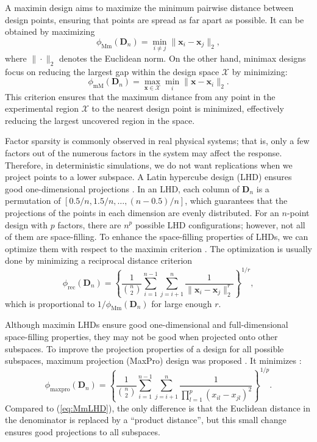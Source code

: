 A maximin design aims to maximize the minimum pairwise distance between design points, ensuring that points are spread as far apart as possible. It can be obtained by maximizing
\begin{equation}\label{eq:maximin}
    \phi_{\text{Mm}}(\bm{D}_n) = \min_{i\neq j} \|\bm{x}_i-\bm{x}_j\|_2,
\end{equation}
where $\|\cdot\|_2$ denotes the Euclidean norm.
On the other hand, minimax designs focus on reducing the largest gap within the design space $\mathcal{X}$ by minimizing:
\begin{equation*}
    \phi_{\text{mM}}(\bm{D}_n) = \max_{\bm{x}\in\mathcal{X}} \min_{i} \|\bm{x}-\bm{x}_i\|_2.
\end{equation*}
This criterion ensures that the maximum distance from any point in the experimental region $\mathcal{X}$ to the nearest design point is minimized, effectively reducing the largest uncovered region in the space. 

Factor sparsity is commonly observed in real physical systems; that is, only a few factors out of the numerous factors in the system may affect the response. Therefore, in deterministic simulations, we do not want replications when we project points to a lower subspace. A Latin hypercube design (LHD) ensures good one-dimensional projections \citep{mckay1979comparison}. In an LHD, each column of $\bm{D}_n$ is a permutation of $\left[0.5/n, 1.5/n, \dots, (n-0.5)/n\right]$, which guarantees that the projections of the points in each dimension are evenly distributed. For an $n$-point design with $p$ factors, there are $n^p$ possible LHD configurations; however, not all of them are space-filling. To enhance the space-filling properties of LHDs, we can optimize them with respect to the maximin criterion \citep{morris1995exploratory}. The optimization is usually done by minimizing a reciprocal distance criterion
\begin{equation}\label{eq:MmLHD}
    \phi_{\text{rec}}(\bm{D}_n) = \left\{\frac{1}{{n\choose 2}}\sum_{i=1}^{n-1}\sum_{j=i+1}^{n}\frac{1}{\|\bm{x}_i-\bm{x}_j\|_2^r} \right\}^{1/r},
\end{equation}
which is proportional to $1/\phi_{\text{Mm}}(\bm{D}_n)$ for large enough $r$.

Although maximin LHDs ensure good one-dimensional and full-dimensional space-filling properties, they may not be good when projected onto other subspaces. To improve the projection properties of a design for all possible subspaces, maximum projection (MaxPro) design was proposed \citep{joseph2015maximum}. It minimizes :
\begin{equation}\label{eq:maxpro}
    \phi_{\text{maxpro}}(\bm{D}_n) = \left\{\frac{1}{{n\choose 2}}\sum_{i=1}^{n-1}\sum_{j=i+1}^{n}\frac{1}{\prod_{l=1}^p(x_{il}-x_{jl})^2}\right\}^{1/p}.
\end{equation}
Compared to (\ref{eq:MmLHD}), the only difference is that the Euclidean distance in the denominator is replaced by a ``product distance'', but this small change ensures good projections to all subspaces.

